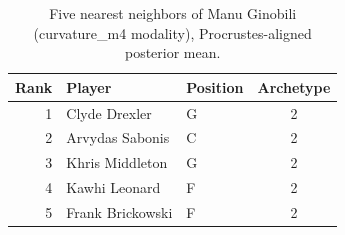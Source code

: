 \begin{table}[htbp]
  \centering\small
  \begin{tabular}{rllc}
    \toprule
    Rank & Player & Position & Archetype \\
    \midrule
    1 & Clyde Drexler & G & 2 \\
    2 & Arvydas Sabonis & C & 2 \\
    3 & Khris Middleton & G & 2 \\
    4 & Kawhi Leonard & F & 2 \\
    5 & Frank Brickowski & F & 2 \\
    \bottomrule
  \end{tabular}
  \caption{Five nearest neighbors of Manu Ginobili (curvature_m4 modality), Procrustes-aligned posterior mean.}
  \label{tab:Manu_Ginobili_neighbors_curvature_m4}
\end{table}

